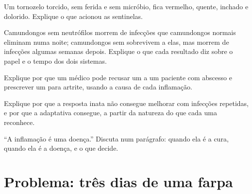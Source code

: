\begin{exercise}[$\star\star$]\label{exo:g12:innate-immunity:11}
Um tornozelo torcido, sem ferida e sem micróbio, fica vermelho,
quente, inchado e dolorido. Explique o que acionou as  sentinelas.
\end{exercise}

\begin{exercise}[$\star\star\star$]\label{exo:g12:innate-immunity:12}
Camundongos sem neutrófilos morrem de infecções que camundongos normais
eliminam numa noite; camundongos sem  sobrevivem a
elas, mas morrem de infecções algumas semanas depois. Explique o que
cada resultado diz sobre o papel e o tempo dos dois sistemas.
\end{exercise}

\begin{exercise}[$\star\star\star$]\label{exo:g12:innate-immunity:13}
Explique por que um médico pode recusar um  a um
paciente com abscesso e prescrever um para artrite, usando a causa de
cada inflamação.
\end{exercise}

\begin{exercise}[$\star\star\star$]\label{exo:g12:innate-immunity:14}
Explique por que a resposta inata não consegue melhorar com infecções
repetidas, e por que a adaptativa consegue, a partir da natureza do que
cada uma reconhece.
\end{exercise}

\begin{exercise}[$\star\star\star$]\label{exo:g12:innate-immunity:15}
``A inflamação é uma doença.'' Discuta num parágrafo: quando ela é a
cura, quando ela é a doença, e o que decide.
\end{exercise}

\section{Problema: três dias de uma farpa}

